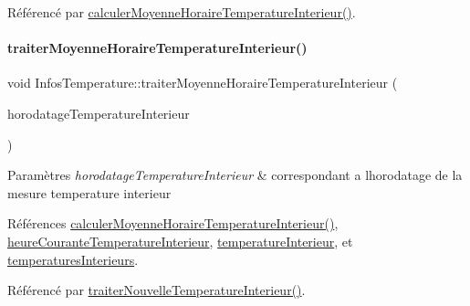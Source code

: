 Référencé par \hyperlink{class_infos_temperature_a8cb8b9bef07506019ea6c9d91809af87}{calculer\+Moyenne\+Horaire\+Temperature\+Interieur()}.

\mbox{\label{class_infos_temperature_a0311c8ce5730388f3baef752920d5abf}} 
\paragraph{\texorpdfstring{traiter\+Moyenne\+Horaire\+Temperature\+Interieur()}{traiterMoyenneHoraireTemperatureInterieur()}}
{\footnotesize\ttfamily void Infos\+Temperature\+::traiter\+Moyenne\+Horaire\+Temperature\+Interieur (\begin{DoxyParamCaption}\item[{Q\+String}]{horodatage\+Temperature\+Interieur }\end{DoxyParamCaption})\hspace{0.3cm}{\ttfamily [private]}}


\begin{DoxyParams}{Paramètres}
{\em horodatage\+Temperature\+Interieur} & correspondant a l\textquotesingle{}horodatage de la mesure temperature interieur \\
\hline
\end{DoxyParams}


Références \hyperlink{class_infos_temperature_a8cb8b9bef07506019ea6c9d91809af87}{calculer\+Moyenne\+Horaire\+Temperature\+Interieur()}, \hyperlink{class_infos_temperature_a708b70383d309fa0ba355dcc3921cc23}{heure\+Courante\+Temperature\+Interieur}, \hyperlink{class_infos_temperature_a976ab7ead7ac82b5b8572807d778689e}{temperature\+Interieur}, et \hyperlink{class_infos_temperature_a39a976c10811a7589e4aba42586813c5}{temperatures\+Interieurs}.



Référencé par \hyperlink{class_infos_temperature_a547da18a7c04603d2f30eece061d9634}{traiter\+Nouvelle\+Temperature\+Interieur()}.


